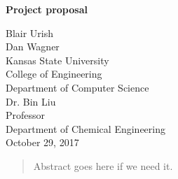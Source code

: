 \documentclass[letterpaper, 12pt]{article}
\begin{document}
\begin{titlepage}
\centering
	\vspace*{5.75cm}
	{\huge\bfseries Project proposal\par}
	\vspace{2cm}
	Blair Urish\\
	Dan Wagner\\
	Kansas State University\\
	College of Engineering\\
	Department of Computer Science\\
	\vspace{1cm}
	Dr. Bin Liu\\
	Professor\\
	Department of Chemical Engineering\\
	\vspace{1cm}
	October 29, 2017
\end{titlepage}

\begin{abstract}
\thispagestyle{plain}
\begin{flushleft}
	Abstract goes here if we need it.
\end{flushleft}
\end{abstract}
~\newpage
\end{document}
